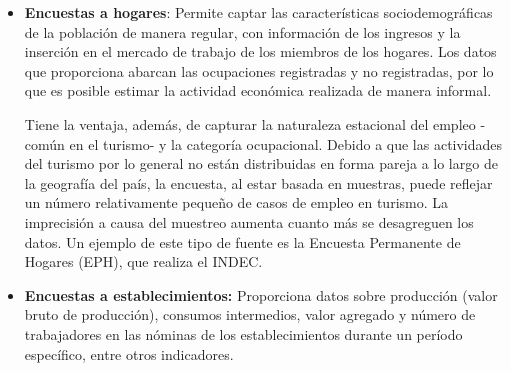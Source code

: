 \documentclass[
  openany]{book}
\begin{document}
\begin{itemize}
\item
  \textbf{Encuestas a hogares}: Permite captar las características sociodemográficas de la población de manera regular, con información de los ingresos y la inserción en el mercado de trabajo de los miembros de los hogares.
  Los datos que proporciona abarcan las ocupaciones registradas y no registradas, por lo que es posible estimar la actividad económica realizada de manera informal.

  Tiene la ventaja, además, de capturar la naturaleza estacional del empleo -común en el turismo- y la categoría ocupacional.
  Debido a que las actividades del turismo por lo general no están distribuidas en forma pareja a lo largo de la geografía del país, la encuesta, al estar basada en muestras, puede reflejar un número relativamente pequeño de casos de empleo en turismo.
  La imprecisión a causa del muestreo aumenta cuanto más se desagreguen los datos.
  Un ejemplo de este tipo de fuente es la Encuesta Permanente de Hogares (EPH), que realiza el INDEC.
\item
  \textbf{Encuestas a establecimientos:} Proporciona datos sobre producción (valor bruto de producción), consumos intermedios, valor agregado y número de trabajadores en las nóminas de los establecimientos durante un período específico, entre otros indicadores.


\end{itemize}
\end{document}
